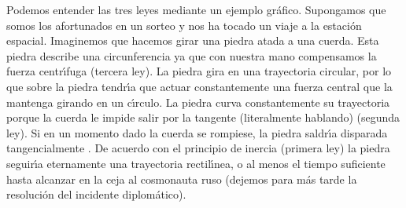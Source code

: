 %
%
Podemos entender las tres leyes mediante un ejemplo gr\'afico\cite{Kepler-second-law-gif}. Supongamos que somos los afortunados en un sorteo y nos ha tocado un viaje a la estaci\'on espacial. Imaginemos que hacemos girar una piedra atada a una cuerda. Esta piedra describe una circunferencia ya que con nuestra mano compensamos la fuerza centr\'\i{}fuga (tercera ley). La piedra gira en una trayectoria circular, por lo que sobre la piedra tendr\'\i{}a que actuar constantemente una fuerza central que la mantenga girando en un c\'\i{}rculo. La piedra curva constantemente su trayectoria porque la cuerda le impide salir por la tangente (literalmente hablando) (segunda ley). Si en un momento dado la cuerda se rompiese, la piedra saldr\'\i{}a disparada tangencialmente . De acuerdo con el principio de inercia (primera ley) la piedra seguir\'\i{}a eternamente una trayectoria rectil\'\i{}nea, o al menos el tiempo suficiente  hasta alcanzar en la ceja al cosmonauta ruso (dejemos para m\'as tarde la resoluci\'on del incidente diplom\'atico).


